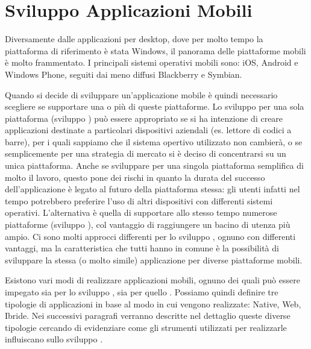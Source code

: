 \chapter{Sviluppo Applicazioni Mobili}
    Diversamente dalle applicazioni per desktop, dove per molto tempo la
    piattaforma di riferimento è stata Windows, il panorama delle piattaforme
    mobili è molto frammentato. I principali sistemi operativi mobili sono: iOS,
    Android e Windows Phone, seguiti dai meno diffusi Blackberry e Symbian.

    Quando si decide di sviluppare un'applicazione mobile è quindi necessario
    scegliere se supportare una o più di queste piattaforme. Lo sviluppo per
    una sola piattaforma (sviluppo \singleplat{}) può essere appropriato se si ha
    intenzione di creare applicazioni destinate a particolari dispositivi
    aziendali (es. lettore di codici a barre), per i quali sappiamo che il
    sistema opertivo utilizzato non cambierà, o se semplicemente per una
    strategia di mercato si è deciso di concentrarsi su un unica piattaforma.
    Anche se sviluppare per una singola piattaforma semplifica di
    molto il lavoro, questo pone dei rischi in quanto la durata del successo
    dell'applicazione è legato al futuro della piattaforma stessa: gli utenti
    infatti nel tempo potrebbero preferire l'uso di altri dispositivi con
    differenti sistemi operativi.
    L'alternativa è quella di supportare allo stesso tempo numerose piattaforme
    (sviluppo \crossplat{}), col vantaggio di raggiungere un bacino di utenza
    più ampio.
    Ci sono molti approcci differenti per lo sviluppo \crossplat{}, ognuno con
    differenti vantaggi, ma la caratteristica che tutti hanno in comune è la
    possibilità di sviluppare la stessa (o molto simile) applicazione per
    diverse piattaforme mobili.

    Esistono vari modi di realizzare applicazioni mobili, ognuno dei quali può
    essere impegato sia per lo sviluppo \singleplat{}, sia per quello
    \crossplat{}.
    Possiamo quindi definire tre tipologie di applicazioni in base al modo in
    cui vengono realizzate: Native, Web, Ibride.
    Nei successivi paragrafi verranno descritte nel dettaglio queste diverse
    tipologie cercando di evidenziare come gli strumenti utilizzati per
    realizzarle influiscano sullo sviluppo \crossplat{}.

